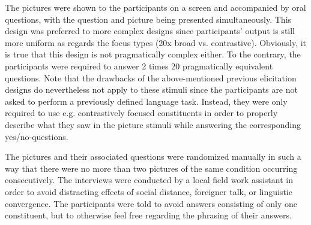 \documentclass[output=paper]{langsci/langscibook}
\begin{document}
\begin{enumerate}[(i)]

The pictures were shown to the participants on a screen and accompanied by oral questions, with the question and picture being presented simultaneously. This design was preferred to more complex designs since participants' output is still more uniform as regards the focus types (20x broad vs. contrastive). Obviously, it is true that this design is not pragmatically complex either. To the contrary, the participants were required to answer 2 times 20 pragmatically equivalent questions. Note that the drawbacks of the above-mentioned previous elicitation designs do nevertheless not apply to these stimuli since the participants are not asked to perform a previously defined language task. Instead, they were only required to use e.g. contrastively focused constituents in order to properly describe what they saw in the picture stimuli while answering the corresponding yes/no-questions. 

The pictures and their associated questions were randomized manually in such a way that there were no more than two pictures of the same condition occurring consecutively. The interviews were conducted by a local field work assistant in order to avoid distracting effects of social distance, foreigner talk, or linguistic convergence. The participants were told to avoid answers consisting of only one constituent, but to otherwise feel free regarding the phrasing of their answers. 



\end{enumerate}
\end{document}
